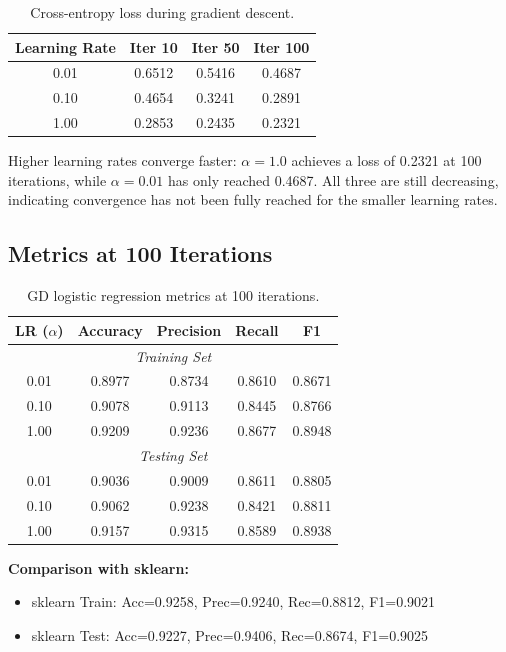 \documentclass[11pt]{article}
\begin{document}
\begin{table}[h]
\centering
\begin{tabular}{cccc}
\toprule
\textbf{Learning Rate} & \textbf{Iter 10} & \textbf{Iter 50} & \textbf{Iter 100} \\
\midrule
0.01 & 0.6512 & 0.5416 & 0.4687 \\
0.10 & 0.4654 & 0.3241 & 0.2891 \\
1.00 & 0.2853 & 0.2435 & 0.2321 \\
\bottomrule
\end{tabular}
\caption{Cross-entropy loss during gradient descent.}
\end{table}

Higher learning rates converge faster: $\alpha=1.0$ achieves a loss of 0.2321 at 100 iterations, while $\alpha=0.01$ has only reached 0.4687. All three are still decreasing, indicating convergence has not been fully reached for the smaller learning rates.

\subsection*{Metrics at 100 Iterations}

\begin{table}[h]
\centering
\begin{tabular}{ccccc}
\toprule
\textbf{LR ($\alpha$)} & \textbf{Accuracy} & \textbf{Precision} & \textbf{Recall} & \textbf{F1} \\
\midrule
\multicolumn{5}{c}{\textit{Training Set}} \\
\midrule
0.01 & 0.8977 & 0.8734 & 0.8610 & 0.8671 \\
0.10 & 0.9078 & 0.9113 & 0.8445 & 0.8766 \\
1.00 & 0.9209 & 0.9236 & 0.8677 & 0.8948 \\
\midrule
\multicolumn{5}{c}{\textit{Testing Set}} \\
\midrule
0.01 & 0.9036 & 0.9009 & 0.8611 & 0.8805 \\
0.10 & 0.9062 & 0.9238 & 0.8421 & 0.8811 \\
1.00 & 0.9157 & 0.9315 & 0.8589 & 0.8938 \\
\bottomrule
\end{tabular}
\caption{GD logistic regression metrics at 100 iterations.}
\end{table}

\noindent\textbf{Comparison with sklearn:}
\begin{itemize}
    \item sklearn Train: Acc=0.9258, Prec=0.9240, Rec=0.8812, F1=0.9021
    \item sklearn Test: Acc=0.9227, Prec=0.9406, Rec=0.8674, F1=0.9025
\end{itemize}
\end{document}
